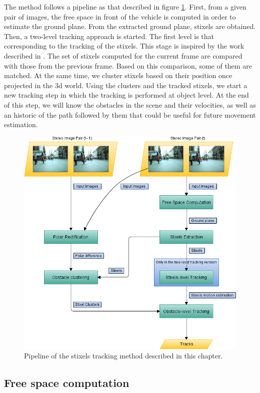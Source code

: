 The method follows a pipeline as that described in figure \ref{fig:cp04_pipeline}. First, from a given pair of images, the free space in front of the vehicle is computed in order to estimate the ground plane. From the extracted ground plane, stixels are obtained. Then, a two-level tracking approach is started. The first level is that corresponding to the tracking of the stixels. This stage is inspired by the work described in \cite{gunyel2012stixels}. The set of stixels computed for the current frame are compared with those from the previous frame. Based on this comparison, some of them are matched. At the same time, we cluster stixels based on their position once projected in the 3d world. Using the clusters and the tracked stixels, we start a new tracking step in which the tracking is performed at object level. At the end of this step, we will know the obstacles in the scene and their velocities, as well as an historic of the path followed by them that could be useful for future movement estimation.

\begin{figure}[h!]
  \centering
  \includegraphics{pipeline}
  \caption{Pipeline of the stixels tracking method described in this chapter.}\label{fig:cp04_pipeline}
\end{figure}

\subsection{Free space computation}\label{ch:chapter04_01_01}

